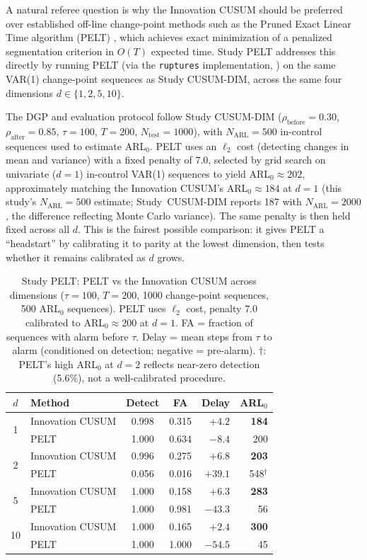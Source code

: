 \documentclass[bj,authoryear]{imsart}
\theoremstyle{plain}
\theoremstyle{definition}
\begin{document}
A natural referee question is why the Innovation CUSUM should be preferred over
established off-line change-point methods such as the Pruned Exact Linear
Time algorithm (PELT) \citep{killick2012optimal}, which achieves exact
minimization of a penalized segmentation criterion in $O(T)$ expected time.
Study PELT addresses this directly by running PELT (via the \texttt{ruptures}
implementation, \citealt{truong2020selective}) on the same VAR(1)
change-point sequences as Study CUSUM-DIM, across the same four dimensions
$d \in \{1, 2, 5, 10\}$.

The DGP and evaluation protocol follow Study CUSUM-DIM
($\rho_{\mathrm{before}}=0.30$, $\rho_{\mathrm{after}}=0.85$, $\tau=100$,
$T=200$, $N_{\mathrm{test}}=1000$), with $N_{\mathrm{ARL}}=500$
in-control sequences used to estimate ARL$_0$.
PELT uses an $\ell_2$ cost (detecting changes in mean and variance) with a fixed
penalty of $7.0$, selected by grid search on univariate ($d=1$) in-control
VAR(1) sequences to yield ARL$_0 \approx 202$, approximately matching the Innovation CUSUM's
ARL$_0 \approx 184$ at $d=1$ (this study's $N_{\mathrm{ARL}}=500$ estimate; Study~CUSUM-DIM reports 187 with $N_{\mathrm{ARL}}=2000$, the difference reflecting Monte Carlo variance).  The same penalty is then held fixed across all $d$.
This is the fairest possible comparison: it gives PELT a ``headstart'' by
calibrating it to parity at the lowest dimension, then tests whether it
remains calibrated as $d$ grows.

\begin{table}[t]
\centering
\caption{Study PELT: PELT vs the Innovation CUSUM across dimensions
  ($\tau=100$, $T=200$, 1000 change-point sequences, 500 ARL$_0$ sequences).
  PELT uses $\ell_2$ cost, penalty $7.0$ calibrated to ARL$_0 \approx 200$ at $d=1$.
  FA = fraction of sequences with alarm before $\tau$.
  Delay = mean steps from $\tau$ to alarm (conditioned on detection; negative = pre-alarm).
  $\dagger$: PELT's high ARL$_0$ at $d=2$ reflects near-zero detection (5.6\%),
  not a well-calibrated procedure.}
\label{tab:pelt}
\small
\begin{tabular}{clccrr}
\toprule
$d$ & Method & Detect & FA & Delay & ARL$_0$ \\
\midrule
\multirow{2}{*}{1}
  & Innovation CUSUM  & 0.998 & 0.315 & $+4.2$ & \textbf{184} \\
  & PELT       & 1.000 & 0.634 & $-8.4$ & 200 \\
\midrule
\multirow{2}{*}{2}
  & Innovation CUSUM  & 0.996 & 0.275 & $+6.8$ & \textbf{203} \\
  & PELT       & 0.056 & 0.016 & $+39.1$ & 548$^\dagger$ \\
\midrule
\multirow{2}{*}{5}
  & Innovation CUSUM  & 1.000 & 0.158 & $+6.3$ & \textbf{283} \\
  & PELT       & 1.000 & 0.981 & $-43.3$ & 56 \\
\midrule
\multirow{2}{*}{10}
  & Innovation CUSUM  & 1.000 & 0.165 & $+2.4$ & \textbf{300} \\
  & PELT       & 1.000 & 1.000 & $-54.5$ & 45 \\
\bottomrule
\end{tabular}
\end{table}
\end{document}
